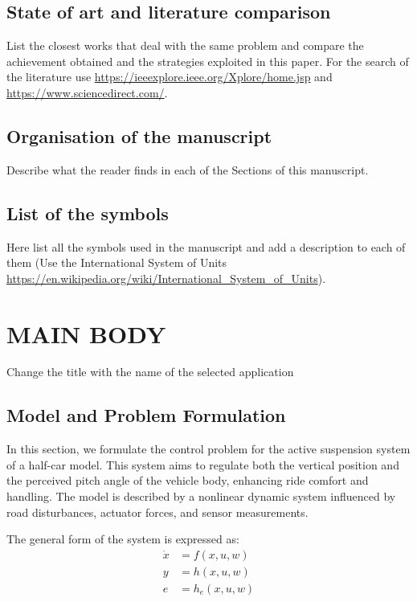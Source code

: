 \documentclass[]{report}
\begin{document}
	\section{State of art and literature comparison}
	List the closest works that deal with the same problem and compare the achievement obtained and the strategies exploited in this paper. For the search of the literature use \url{https://ieeexplore.ieee.org/Xplore/home.jsp} and \url{https://www.sciencedirect.com/}.
	
	\section{Organisation of the manuscript}
	Describe what the reader finds in each of the Sections of this manuscript.
	
	\section{List of the symbols}
	Here list all the symbols used in the manuscript and add a description to each of them (Use the International System of Units \url{https://en.wikipedia.org/wiki/International_System_of_Units}).
	
	\chapter{MAIN BODY}
	Change the title with the name of the selected application
	
	\section{Model and Problem Formulation}
	In this section, we formulate the control problem for the active suspension system of a half-car model. This system aims to regulate both the vertical position and the perceived pitch angle of the vehicle body, enhancing ride comfort and handling. The model is described by a nonlinear dynamic system influenced by road disturbances, actuator forces, and sensor measurements.
	
	The general form of the system is expressed as:
	\begin{align}
		\dot{x} &= f(x, u, w) \\
		y &= h(x, u, w) \\
		e &= h_e(x, u, w)
	\end{align}
	
\end{document}
